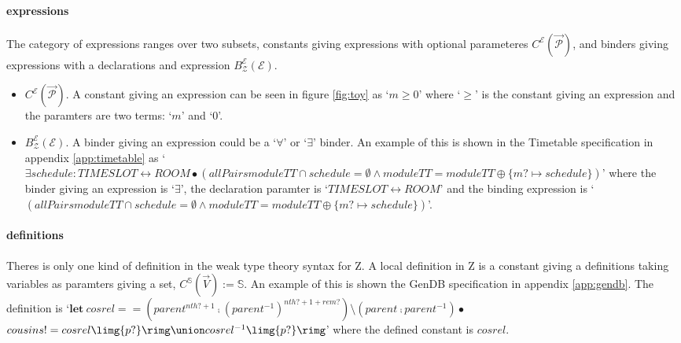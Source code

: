 \paragraph{expressions}
\label{subsubsec:expressions}

The category of expressions ranges over two subsets, constants giving
expressions with optional parameteres
$C^{\mathcal{E}}(\overrightarrow{\mathcal{P}})$, and binders giving expressions
with a declarations and expression $B^{\mathcal{E}}_{\mathcal{Z}}(\mathcal{E})$.

\begin{itemize}
\item $C^{\mathcal{E}}(\overrightarrow{\mathcal{P}})$. A constant giving an
expression can be seen in figure \ref{fig:toy} as `$m \geq 0$' where `$\geq$' is
the constant giving an expression and the paramters are two terms: `$m$' and
`$0$'.

\item $B^{\mathcal{E}}_{\mathcal{Z}}(\mathcal{E})$. A binder giving an
expression could be a `$\forall$' or `$\exists$' binder. An example of this is
shown in the Timetable specification in appendix \ref{app:timetable} as
\newline
`$\exists schedule : TIMESLOT \leftrightarrow ROOM \bullet(allPairs moduleTT
\cap schedule = \emptyset \land moduleTT = moduleTT \oplus \{m? \mapsto
schedule\})$'
\newline
where the binder giving an expression is `$\exists$', the declaration paramter
is `$TIMESLOT \leftrightarrow ROOM$' and the binding expression is `$(allPairs
moduleTT \cap schedule = \emptyset \land moduleTT = moduleTT \oplus \{m? \mapsto
schedule\})$'.
\end{itemize}

\paragraph{definitions}
\label{subsubsec:definitions}

Theres is only one kind of definition in the weak type theory syntax for Z. A
local definition in Z is a constant giving a definitions taking variables as
paramters giving a set, $C^{\mathbb{S}}(\overrightarrow{V}):= \mathbb{S}$. An
example of this is shown the GenDB specification in appendix \ref{app:gendb}.
The definition is
\newline
 `$\mathbf{let}\
 cosrel==(parent^{nth?+1}\comp(parent^{-1})^{nth?+1+rem?})\setminus (parent
 \comp parent^{-1}) \bullet$\newline
\indent $cousins! = cosrel \limg \{p?\}\rimg \union cosrel^{-1} \limg \{p?\}
\rimg$'
\newline
where the defined constant is $cosrel$.

